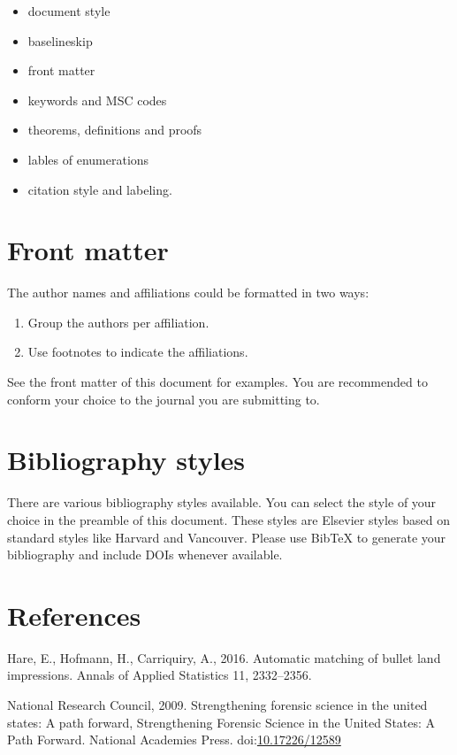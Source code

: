 \documentclass[]{elsarticle} %
\begin{document}
\begin{itemize}
\item
  document style
\item
  baselineskip
\item
  front matter
\item
  keywords and MSC codes
\item
  theorems, definitions and proofs
\item
  lables of enumerations
\item
  citation style and labeling.
\end{itemize}

\hypertarget{front-matter}{%
\section{Front matter}\label{front-matter}}

The author names and affiliations could be formatted in two ways:

\begin{enumerate}
\def\labelenumi{(\arabic{enumi})}
\item
  Group the authors per affiliation.
\item
  Use footnotes to indicate the affiliations.
\end{enumerate}

See the front matter of this document for examples. You are recommended
to conform your choice to the journal you are submitting to.

\hypertarget{bibliography-styles}{%
\section{Bibliography styles}\label{bibliography-styles}}

There are various bibliography styles available. You can select the
style of your choice in the preamble of this document. These styles are
Elsevier styles based on standard styles like Harvard and Vancouver.
Please use BibTeX to generate your bibliography and include DOIs
whenever available.

\hypertarget{references}{%
\section*{References}\label{references}}

\hypertarget{refs}{}
\leavevmode\hypertarget{ref-Hare2016}{}%
Hare, E., Hofmann, H., Carriquiry, A., 2016. Automatic matching of
bullet land impressions. Annals of Applied Statistics 11, 2332--2356.

\leavevmode\hypertarget{ref-Council2009}{}%
National Research Council, 2009. Strengthening forensic science in the
united states: A path forward, Strengthening Forensic Science in the
United States: A Path Forward. National Academies Press.
doi:\href{https://doi.org/10.17226/12589}{10.17226/12589}
\end{document}
